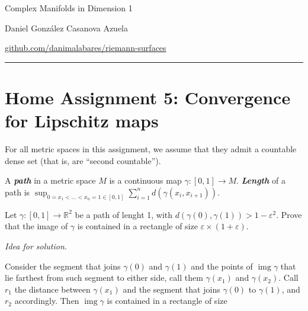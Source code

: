 \documentclass{article}
\newcommand{\R}{\mathbb{R}}
\DeclareMathOperator{\img}{img}
\begin{document}
\begin{minipage}{\textwidth}
	\begin{minipage}{.5\textwidth}
		Complex Manifolds in Dimension 1\\
	\end{minipage}%
	\begin{minipage}{.5\textwidth}
		\raggedleft
		Daniel González Casanova Azuela\par
		{\small\href{https://github.com/danimalabares/riemann-surfaces}{github.com/danimalabares/riemann-surfaces}}
	\end{minipage}%
\end{minipage}\vspace{.2cm}\hrule
\section{Home Assignment 5: Convergence for Lipschitz maps}
\setcounter{section}{5}
\begin{remark}
	For all metric spaces in this assignment, we assume that they admit a countable dense set (that is, are “second countable”).
\end{remark}
\begin{defn}
	A \textbf{\textit{path}} in a metric space $M$ is a continuous map $\gamma : [0, 1] \to M$. \textbf{\textit{Length}} of a path is $\sup_{0=x_1<\ldots<x_n=1\in[0,1]}\sum_{i=1}^nd(\gamma(x_i,x_{i+1}))$.
\end{defn}
\begin{exercise}
	Let $\gamma:[0,1]\to\R^2$ be a path of lenght 1, with $d(\gamma(0),\gamma(1))>1-\varepsilon^2$. Prove that the image of $\gamma$ is contained in a rectangle of size $\varepsilon\times(1+\varepsilon)$.
\end{exercise}
\textit{Idea for solution.$\quad$}

	Consider the segment that joins $\gamma(0)$ and $\gamma(1)$ and the points of $\img\gamma$ that lie farthest from such segment to either side, call them $\gamma(x_1)$ and $\gamma(x_2)$. Call $r_1$ the distance between $\gamma(x_1)$ and the segment that joins $\gamma(0)$ to $\gamma(1)$, and $r_2$ accordingly. Then $\img\gamma$ is contained in a rectangle of size
\end{document}
